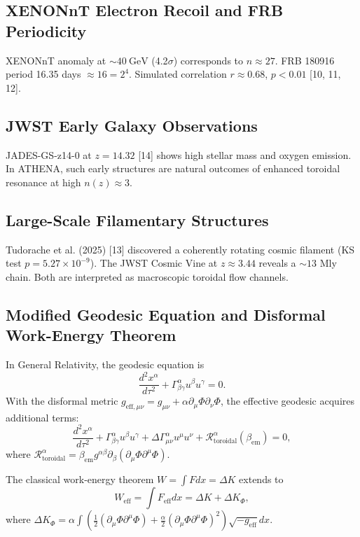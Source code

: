 \documentclass[12pt, a4paper]{article}
\begin{document}
\subsection{XENONnT Electron Recoil and FRB Periodicity}
XENONnT anomaly at $\sim 40\ \mathrm{GeV}$ (4.2$\sigma$) corresponds to $n\approx 27$. FRB 180916 period 16.35 days $\approx 16 = 2^{4}$. Simulated correlation $r\approx 0.68$, $p< 0.01$ [10, 11, 12].

\subsection{JWST Early Galaxy Observations}
JADES-GS-z14-0 at $z = 14.32$ [14] shows high stellar mass and oxygen emission. In ATHENA, such early structures are natural outcomes of enhanced toroidal resonance at high $n(z)\approx 3$.

\subsection{Large-Scale Filamentary Structures}
Tudorache et al. (2025) [13] discovered a coherently rotating cosmic filament (KS test $p = 5.27\times 10^{- 9}$). The JWST Cosmic Vine at $z\approx 3.44$ reveals a $\sim 13$ Mly chain. Both are interpreted as macroscopic toroidal flow channels.

\subsection{Modified Geodesic Equation and Disformal Work-Energy Theorem}
In General Relativity, the geodesic equation is
\begin{equation}
\frac{d^2x^\alpha}{d\tau^2} +\Gamma_{\beta \gamma}^\alpha u^\beta u^\gamma = 0.
\end{equation}
With the disformal metric $g_{\mathrm{eff},\mu \nu} = g_{\mu \nu} + \alpha \partial_{\mu}\Phi \partial_{\nu}\Phi$, the effective geodesic acquires additional terms:
\begin{equation}
\frac{d^2x^\alpha}{d\tau^2} +\Gamma_{\beta \gamma}^\alpha u^\beta u^\gamma +\Delta \Gamma_{\mu \nu}^\alpha u^\mu u^\nu +\mathcal{R}_{\mathrm{toroidal}}^{\alpha}(\beta_{\mathrm{em}}) = 0,
\end{equation}
where $\mathcal{R}_{\mathrm{toroidal}}^{\alpha} = \beta_{\mathrm{em}}g^{\alpha \beta}\partial_{\beta}(\partial_{\mu}\Phi \partial^{\mu}\Phi)$.

The classical work-energy theorem $W = \int Fdx = \Delta K$ extends to
\begin{equation}
W_{\mathrm{eff}} = \int F_{\mathrm{eff}}dx = \Delta K + \Delta K_{\Phi},
\end{equation}
where $\Delta K_{\Phi} = \alpha \int \left(\frac{1}{2} (\partial_{\mu}\Phi \partial^{\mu}\Phi) + \frac{\alpha}{2} (\partial_{\mu}\Phi \partial^{\mu}\Phi)^{2}\right)\sqrt{-g_{\mathrm{eff}}} dx$.
\end{document}
